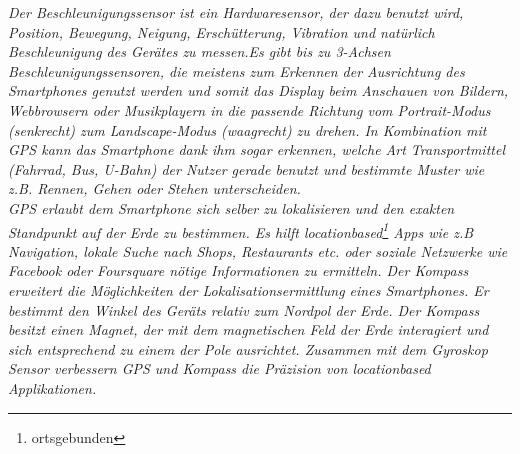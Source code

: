  \textit{Der Beschleunigungssensor ist ein Hardwaresensor, der dazu benutzt wird, Position, Bewegung, Neigung, Erschütterung, Vibration und natürlich Beschleunigung des Gerätes zu messen.Es gibt bis zu 3-Achsen Beschleunigungssensoren, die meistens zum Erkennen der Ausrichtung des \glspl{Smartphone} genutzt werden und somit das Display beim Anschauen von Bildern, Webbrowsern oder Musikplayern in die passende Richtung vom Portrait-Modus (senkrecht) zum Landscape-Modus (waagrecht) zu drehen. In Kombination mit \gls{GPS} kann das \gls{Smartphone} dank ihm sogar erkennen, welche Art Transportmittel (Fahrrad, Bus, U-Bahn) der Nutzer gerade benutzt und bestimmte Muster wie z.B. Rennen, Gehen oder Stehen unterscheiden.\\
\gls{GPS} erlaubt dem \gls{Smartphone} sich selber zu lokalisieren und den exakten Standpunkt auf der Erde zu bestimmen. Es hilft locationbased\footnote{ ortsgebunden} \Glspl{App} wie z.B Navigation, lokale Suche nach Shops, Restaurants etc. oder soziale Netzwerke wie Facebook oder Foursquare nötige Informationen zu ermitteln. Der Kompass erweitert die Möglichkeiten der Lokalisationsermittlung eines \gls{Smartphone}s. Er bestimmt den Winkel des Geräts relativ zum Nordpol der Erde. Der Kompass besitzt einen Magnet, der mit dem magnetischen Feld der Erde interagiert und sich entsprechend zu einem der Pole ausrichtet. Zusammen mit dem Gyroskop Sensor verbessern \gls{GPS} und Kompass die Präzision von locationbased Applikationen.}
